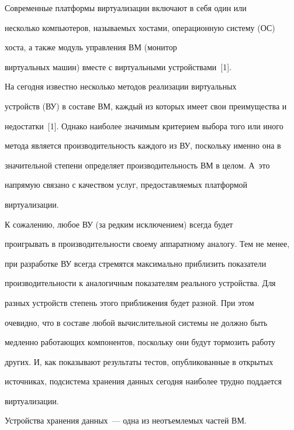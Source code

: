      


     Современные платформы виртуализации включают в себя один или 


несколько компьютеров, называемых хостами, операционную систему (ОС) 


хоста, а также модуль управления ВМ (монитор 


виртуальных машин) вместе с виртуальными устройствами~[1].


     


     На сегодня известно несколько методов реализации виртуальных 


устройств (ВУ) в составе ВМ, каждый из которых имеет свои преимущества и 


недостатки~[1]. Однако наиболее значимым критерием выбора того или иного 


метода является производительность каждого из ВУ, поскольку именно она в 


значительной степени определяет производительность ВМ в целом. А~это 


напрямую связано с качеством услуг, предоставляемых платформой 


виртуализации.


     


     К сожалению, любое ВУ (за редким исключением) всегда будет 


проигрывать в производительности своему аппаратному аналогу. Тем не менее, 


при разработке ВУ всегда стремятся максимально приблизить показатели 


производительности к аналогичным показателям реального устройства. Для 


разных устройств степень этого приближения будет разной. При этом 


очевидно, что в составе любой вычислительной системы не должно быть 


медленно работающих компонентов, поскольку они будут тормозить работу 


других. И, как показывают результаты тестов, опубликованные в открытых 


источниках, подсистема хранения данных сегодня наиболее трудно поддается 


виртуализации.


     


     Устройства хранения данных~--- одна из неотъемлемых частей ВМ. 


